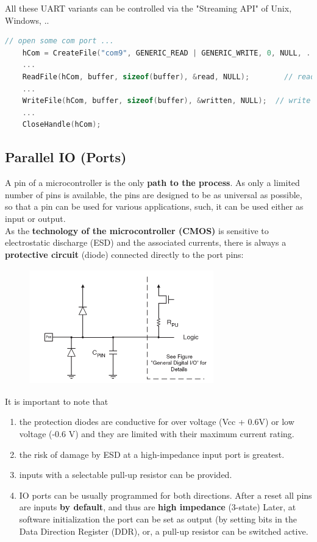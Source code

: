 All these UART variants can be controlled via the "Streaming API" of Unix, Windows, .. \\

\begin{lstlisting}[style=mystyle, language=c]
// open some com port ... 
	hCom = CreateFile("com9", GENERIC_READ | GENERIC_WRITE, 0, NULL, ... );
	...
  	ReadFile(hCom, buffer, sizeof(buffer), &read, NULL);  		// read from com port
	...
	WriteFile(hCom, buffer, sizeof(buffer), &written, NULL);  // write to com port
	...
	CloseHandle(hCom);
\end{lstlisting}

\subsection{ Parallel IO (Ports)}

A pin of a microcontroller is the only \textbf{path to the process}. As only a limited number of pins is  available, the pins are designed to be as universal as possible, so that a pin can be used for various applications, such, it can be used either as input or output.\\

As the \textbf{technology of the microcontroller (CMOS)} is sensitive to electrostatic discharge (ESD) and the associated currents, there is always a \textbf{protective circuit} (diode) connected directly to the port pins:

    \begin{figure}[h]
    \centering
    \includegraphics[width=8cm, height=5cm]{Images/image51.png}
    \label{fig:Fig }
    \end{figure}

It is important to note that

\begin{enumerate}
\item  the protection diodes are conductive for over voltage (Vcc + 0.6V) or low voltage (-0.6 V) and they are limited with their maximum current rating.
\item  the risk of damage by ESD at a high-impedance input port is greatest.
\item  inputs with a selectable pull-up resistor can be provided.
\item  IO ports can be usually programmed for both directions. After a reset all pins are inputs \textbf{by default}, and thus are \textbf{high impedance} (3-state) Later, at software initialization the port can be set as output (by setting bits in the Data Direction Register (DDR),  or, a pull-up resistor can be switched active.
\end{enumerate}

